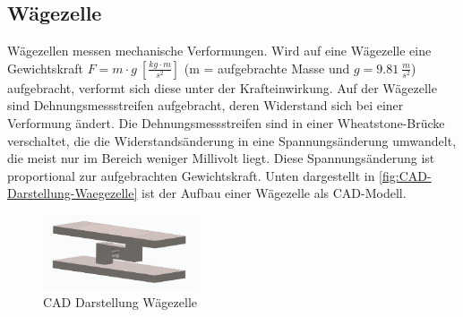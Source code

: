 \subsection{Wägezelle}
Wägezellen messen mechanische Verformungen.
Wird auf eine Wägezelle eine Gewichtskraft \mbox{$F = m \cdot g \: [\frac{kg \cdot m}{s^2}]$} (m = aufgebrachte Masse und $g = 9.81 \: \frac{m}{s^2}$)  aufgebracht, verformt sich diese unter der Krafteinwirkung.
Auf der Wägezelle sind Dehnungsmessstreifen aufgebracht, deren Widerstand sich bei einer Verformung ändert.
Die Dehnungsmessstreifen sind in einer Wheatstone-Brücke verschaltet, die die Widerstandsänderung in eine Spannungsänderung umwandelt, die meist nur im Bereich weniger Millivolt liegt.
Diese Spannungsänderung ist proportional zur aufgebrachten Gewichtskraft.
Unten dargestellt in \autoref{fig:CAD-Darstellung-Waegezelle} ist der Aufbau einer Wägezelle als CAD-Modell. \\
\begin{figure}[h!]
    \centering
    \includegraphics[width=0.4\textwidth]{img/CAD_Waegezelle.png}
    \caption{CAD Darstellung Wägezelle}
    \label{fig:CAD-Darstellung-Waegezelle}
\end{figure}


